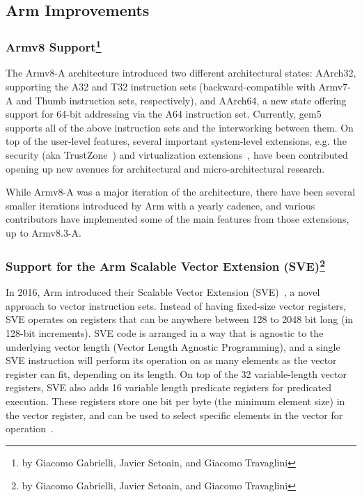 \subsection[Arm Improvements]{Arm Improvements}
\label{sec:arm}

\subsubsection[Armv8 Support]{Armv8 Support\footnote{by Giacomo Gabrielli, Javier Setoain, and Giacomo Travaglini}}

The Armv8-A architecture introduced two different architectural states:
AArch32, supporting the A32 and T32 instruction sets (backward-compatible with
Armv7-A and Thumb instruction sets, respectively), and AArch64, a new
state offering support for 64-bit addressing via the A64 instruction set. Currently, gem5
supports all of the above instruction sets and the interworking
between them.
On top of the user-level features, several important system-level extensions, e.g. the
security (aka TrustZone~\cite{ArmTustZone}) and virtualization extensions~\cite{ArmARM}, have been contributed opening up new avenues for architectural and micro-architectural research.

While Armv8-A was a major iteration of the architecture, there have been
several smaller iterations introduced by Arm with a yearly cadence, and various
contributors have implemented some of the main features from those extensions,
up to Armv8.3-A.

\subsubsection[Support for the Arm Scalable Vector Extension (SVE)]{Support for the Arm Scalable Vector Extension (SVE)\footnote{by Giacomo Gabrielli, Javier Setoain, and Giacomo Travaglini}}

In 2016, Arm introduced their Scalable Vector Extension (SVE)~\cite{ArmARM}, a
novel approach to vector instruction sets. Instead of having fixed-size vector
registers, SVE operates on registers that can be anywhere between 128 to 2048
bit long (in 128-bit increments). SVE code is arranged in a way that is agnostic to the
underlying vector length (Vector Length Agnostic Programming), and a single SVE
instruction will perform its operation on as many elements as the vector
register can fit, depending on its length. On top of the 32 variable-length
vector registers, SVE also adds 16 variable length predicate registers for
predicated execution. These registers store one bit per byte (the minimum
element size) in the vector register, and can be used to select specific
elements in the vector for operation~\cite{white-paper-on-SVE-and-VLA-programming}.

